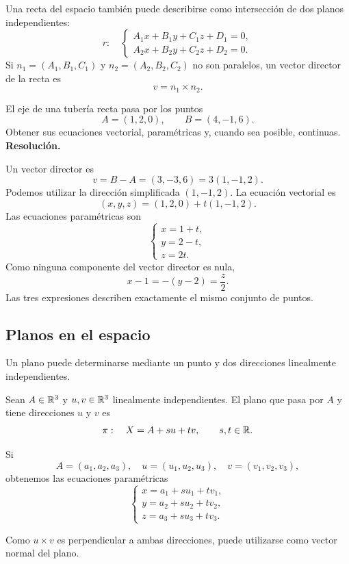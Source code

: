 Una recta del espacio también puede describirse como intersección de dos planos independientes:
\[
r:\quad
\begin{cases}
A_1x+B_1y+C_1z+D_1=0,\\
A_2x+B_2y+C_2z+D_2=0.
\end{cases}
\]
Si $n_1=(A_1,B_1,C_1)$ y $n_2=(A_2,B_2,C_2)$ no son paralelos, un vector director de la recta es
\[
v=n_1\times n_2.
\]

\begin{solvedexercise}
El eje de una tubería recta pasa por los puntos
\[
A=(1,2,0),\qquad B=(4,-1,6).
\]
Obtener sus ecuaciones vectorial, paramétricas y, cuando sea posible, continuas.
\tcblower
\textbf{Resolución.}\par\smallskip
Un vector director es
\[
v=B-A=(3,-3,6)=3(1,-1,2).
\]
Podemos utilizar la dirección simplificada $(1,-1,2)$. La ecuación vectorial es
\[
\boxed{(x,y,z)=(1,2,0)+t(1,-1,2).}
\]
Las ecuaciones paramétricas son
\[
\boxed{
\begin{cases}
x=1+t,\\
y=2-t,\\
z=2t.
\end{cases}}
\]
Como ninguna componente del vector director es nula,
\[
\boxed{x-1=-(y-2)=\frac z2.}
\]
Las tres expresiones describen exactamente el mismo conjunto de puntos.
\end{solvedexercise}

\subsection{Planos en el espacio}

Un plano puede determinarse mediante un punto y dos direcciones linealmente independientes.

\begin{definition}
Sean $A\in\mathbb{R}^3$ y $u,v\in\mathbb{R}^3$ linealmente independientes. El plano que pasa por $A$ y tiene direcciones $u$ y $v$ es
\[
\pi:\quad X=A+su+tv,
\qquad s,t\in\mathbb{R}.
\]
\end{definition}

Si
\[
A=(a_1,a_2,a_3),\quad
u=(u_1,u_2,u_3),\quad
v=(v_1,v_2,v_3),
\]
obtenemos las ecuaciones paramétricas
\[
\begin{cases}
x=a_1+su_1+tv_1,\\
y=a_2+su_2+tv_2,\\
z=a_3+su_3+tv_3.
\end{cases}
\]

Como $u\times v$ es perpendicular a ambas direcciones, puede utilizarse como vector normal del plano.

